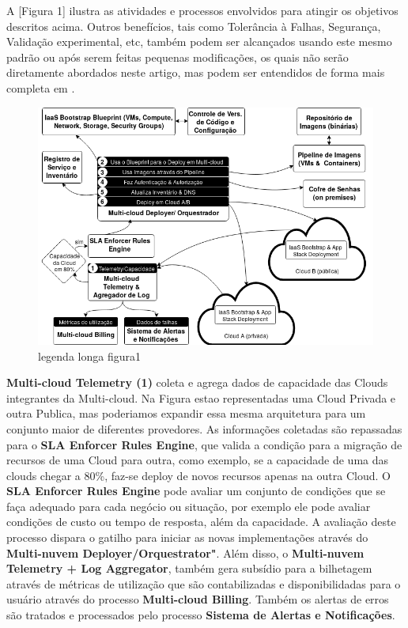 \documentclass[12pt]{article}
\begin{document}
	A [Figura 1] ilustra as atividades e processos envolvidos para atingir os objetivos descritos acima. Outros benefícios, tais como Tolerância à Falhas, Segurança, Validação experimental, etc, também podem ser alcançados usando este mesmo padrão ou após serem feitas pequenas modificações, os quais não serão diretamente abordados neste artigo, mas podem ser entendidos de forma mais completa em \cite{Fisher:2018}.
		
	\begin{figure}[H]
		\centering
		\includegraphics[width=0.9\linewidth]{figuras/Figure1.png}
		\caption{legenda longa figura1}
		\label{fig:figure1}
	\end{figure}
	
	\textbf{Multi-cloud Telemetry (1)} coleta e agrega dados de capacidade das Clouds integrantes da Multi-cloud. Na Figura estao representadas uma Cloud Privada e outra Publica, mas poderiamos expandir essa mesma arquitetura para um conjunto maior de diferentes provedores. As informações coletadas são repassadas para o \textbf{SLA Enforcer Rules Engine}, que valida a condição para a migração de recursos de uma Cloud para outra, como exemplo, se a capacidade de uma das clouds chegar a 80\%, faz-se deploy de novos recursos apenas na outra Cloud. O \textbf{SLA Enforcer Rules Engine} pode avaliar um conjunto de condições que se faça adequado para cada negócio ou situação, por exemplo ele pode avaliar condições de custo ou tempo de resposta, além da capacidade. A avaliação deste processo dispara o gatilho para iniciar as novas implementações através do \textbf{Multi-nuvem Deployer/Orquestrator"}. Além disso, o \textbf{Multi-nuvem Telemetry + Log Aggregator}, também gera subsídio para a bilhetagem através de métricas de utilização que são contabilizadas e disponibilidadas para o usuário através do processo \textbf{Multi-cloud Billing}. Também os alertas de erros são tratados e processados pelo processo \textbf{Sistema de Alertas e Notificações}.
	
\end{document}
